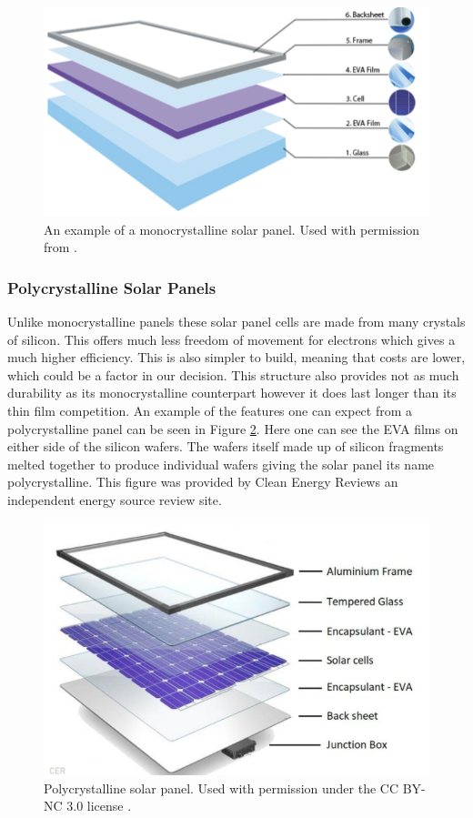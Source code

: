\begin{figure}
    \centering
    \includegraphics[scale=0.5]{figures/monocrystaline.png}
    \caption{An example of a monocrystalline solar panel. Used with permission from \cite{solar-mono-ref}.}
    \label{fig:mono-sp} 
\end{figure}

\subsubsection{Polycrystalline Solar Panels}
Unlike monocrystalline panels these solar panel cells are made from many crystals of silicon. This offers much less freedom of movement for electrons which gives a much higher efficiency. This is also simpler to build, meaning that costs are lower, which could be a factor in our decision. This structure also provides not as much durability as its monocrystalline counterpart however it does last longer than its thin film competition. An example of the features one can expect from a polycrystalline panel can be seen in Figure \ref{fig:poly-sp}. Here one can see the EVA films on either side of the silicon wafers. The wafers itself made up of silicon fragments melted together to produce individual wafers giving the solar panel its name polycrystalline. This figure was provided by Clean Energy Reviews an independent energy source review site.
\cite{Monocrystalline-Vs-Polycrystalline-Solar-Panels:-Whats-best?}
\begin{figure}
    \centering
    \includegraphics[scale=0.4]{figures/polycrystaline solar.png}
    \caption{Polycrystalline solar panel. Used with permission under the CC BY-NC 3.0 license \cite{solar-poly-ref}.}
    \label{fig:poly-sp} 
\end{figure}

